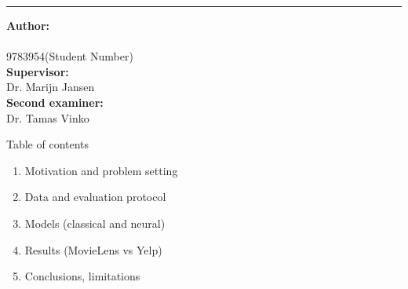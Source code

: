 \documentclass[aspectratio=169,11pt]{beamer}
\newcommand\supervisor{Dr. Marijn Jansen}
\newcommand\secondexaminer{Dr. Tamas Vinko}
\newcommand\studentnumber{9783954}
\begin{document}
\begin{frame}[plain]
\begin{flushleft}
\vspace{0.14cm}
{\rule{\textwidth}{0.6pt}}
\vspace{0.3cm}
\begin{minipage}{0.70\textwidth}
\scriptsize

\textbf{\textcolor{UCRred}{Author:}}\\[-0.05cm]
\insertauthor\\[-0.05cm]
\studentnumber\;(Student Number)\\[0.10cm]

\textbf{\textcolor{UCRred}{Supervisor:}}\\[-0.05cm]
\supervisor\\[0.10cm]

\textbf{\textcolor{UCRred}{Second examiner:}}\\[-0.05cm]
\secondexaminer\\[0.12cm]

\insertdate
\end{minipage}

\end{flushleft}
\end{frame}



\begin{frame}{Table of contents}
\begin{enumerate}
  \item Motivation and problem setting
  \item Data and evaluation protocol
  \item Models (classical and neural)
  \item Results (MovieLens vs Yelp)
  \item Conclusions, limitations
\end{enumerate}
\end{frame}
\end{document}

